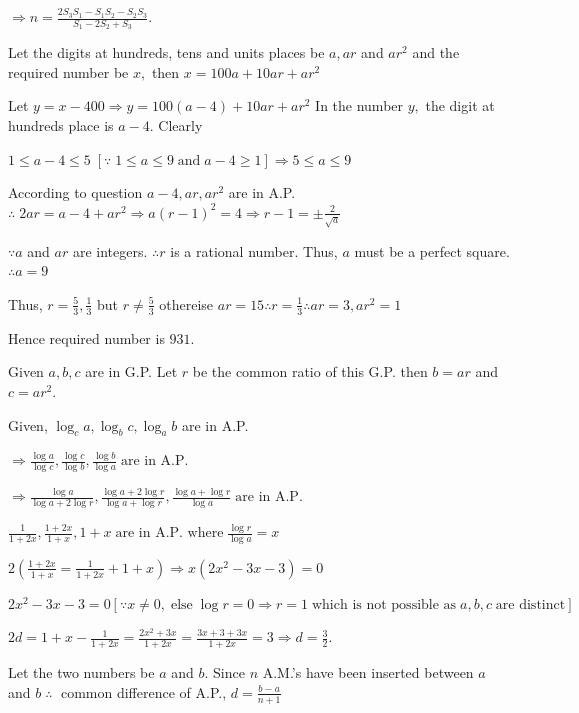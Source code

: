   $\Rightarrow n = \frac{2S_3S_1 - S_1S_2 - S_2S_3}{S_1 - 2S_2 + S_3}$.
\item Let the digits at hundreds, tens and units places be $a, ar$ and $ar^2$ and the required number be $x,$ then
  $x = 100a + 10ar + ar^2$

  Let $y = x - 400 \Rightarrow y = 100(a - 4) + 10ar + ar^2$ In the number $y,$ the digit at hundreds place is $a - 4.$ Clearly

  $1\leq a - 4\leq 5\;[\because\;1\leq a \leq 9 \;\text{and}\;a - 4\geq 1] \Rightarrow 5\leq a\leq 9$

  According to question $a - 4, ar, ar^2$ are in A.P. $\therefore\; 2ar = a - 4 + ar^2\Rightarrow a(r - 1)^2 = 4\Rightarrow r - 1 =
  \pm\frac{2}{\sqrt{a}}$

  $\because a$ and $ar$ are integers. $\therefore r$ is a rational number. Thus, $a$ must be a perfect square. $\therefore a = 9$

  Thus, $r = \frac{5}{3}, \frac{1}{3}$ but $r\neq \frac{5}{3}$ othereise $ar = 15\therefore r = \frac{1}{3}\therefore ar = 3, ar^2
  = 1$

  Hence required number is $931$.
\item Given $a, b, c$ are in G.P. Let $r$ be the common ratio of this G.P. then $b = ar$ and $c = ar^2$.

  Given, $\log_c a, \log_b c, \log_a b$ are in A.P.

  $\Rightarrow \frac{\log a}{\log c}, \frac{\log c}{\log b}, \frac{\log b}{\log a}\;\text{are in A.P.}$

  $\Rightarrow \frac{\log a}{\log a + 2\log r}, \frac{\log a + 2\log r}{\log a + \log r}, \frac{\log a + \log r}{\log a}\;\text{are
    in A.P.}$

  $\frac{1}{1 + 2x}, \frac{1 + 2x}{1 + x}, 1 + x\;\text{are in A.P. where}\;\frac{\log r}{\log a} = x$

  $2\left(\frac{1 + 2x}{1 + x} = \frac{1}{1 + 2x} + 1 + x\right)\Rightarrow x(2x^2 - 3x - 3) = 0$

  $2x^2 - 3x - 3 = 0[\because x\neq 0,\;\text{else}\;\log r = 0 \Rightarrow r = 1\;\text{which is not possible as}\; a, b, c\;\text{are
      distinct}]$

  $2d = 1 + x - \frac{1}{1 + 2x} = \frac{2x^2 + 3x}{1 + 2x} = \frac{3x + 3 + 3x}{1 + 2x} = 3\Rightarrow d =
  \frac{3}{2}$.
\item Let the two numbers be $a$ and $b.$ Since $n$ A.M.'s have been inserted between $a$ and $b\;\therefore\;$ common
  difference of A.P., $d = \frac{b - a}{n + 1}$

